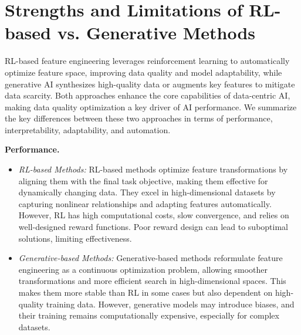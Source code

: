 
\section{Strengths and Limitations of RL-based vs. Generative Methods}

RL-based feature engineering leverages reinforcement learning to automatically optimize feature space, improving data quality and model adaptability, while generative AI synthesizes high-quality data or augments key features to mitigate data scarcity. Both approaches enhance the core capabilities of data-centric AI, making data quality optimization a key driver of AI performance. We summarize the key differences between these two approaches in terms of performance, interpretability, adaptability, and automation.

\noindent
\textbf{Performance.}
\begin{itemize}
    \item \emph{RL-based Methods:} RL-based methods optimize feature transformations by aligning them with the final task objective, making them effective for dynamically changing data. They excel in high-dimensional datasets by capturing nonlinear relationships and adapting features automatically. However, RL has high computational costs, slow convergence, and relies on well-designed reward functions. Poor reward design can lead to suboptimal solutions, limiting effectiveness.
    \item \emph{Generative-based Methods:} Generative-based methods reformulate feature engineering as a continuous optimization problem, allowing smoother transformations and more efficient search in high-dimensional spaces. This makes them more stable than RL in some cases but also dependent on high-quality training data. However, generative models may introduce biases, and their training remains computationally expensive, especially for complex datasets.
\end{itemize}

